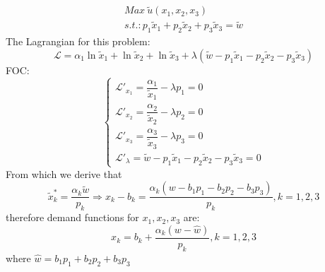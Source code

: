 \documentclass[a4paper,12pt]{article} %
\begin{document}
\begin{enumerate}
	\begin{gather*}
	Max \   \tilde{u}(x_1, x_2, x_3)  \\
	s.t.:  p_1\tilde{x}_1 +  p_2\tilde{x}_2 + p_3\tilde{x}_3 = \tilde{w} 
	\end{gather*}
		The  Lagrangian for this problem: 
	\[  \mathcal{L} =  \alpha_1 \ln \tilde{x}_{1} + \ln \tilde{x}_{2} + \ln \tilde{x}_{3} + \lambda  ( \tilde{w} - p_1\tilde{x}_1 -  p_2\tilde{x}_2 - p_3\tilde{x}_3) \]
	FOC: 
 	\begin{equation*}
\begin{cases}
\mathcal{L}'_{x_1 } =    \dfrac{\alpha_1}{\tilde{x}_{1} }  -   \lambda  p_1 = 0 \\
\mathcal{L}'_{x_2 } =    \dfrac{\alpha_2}{\tilde{x}_{2} }  -   \lambda  p_2 = 0 \\
\mathcal{L}'_{x_3 } =    \dfrac{\alpha_3}{\tilde{x}_{3} }  -   \lambda  p_3 = 0 \\
\mathcal{L}'_{\lambda} = \tilde{w} - p_1\tilde{x}_1 -  p_2\tilde{x}_2 - p_3\tilde{x}_3 = 0 
\end{cases}
\end{equation*}	 
	From which we derive that
\[ \tilde{x}^{*}_{k} = \dfrac{\alpha_k \tilde{w}  }{p_k} \Rightarrow  x_{k} - b_{k}  =  \dfrac{\alpha_k (w - b_1p_1 - b_2p_2 - b_3p_3)   }{p_k}  , k = 1, 2, 3  \]		
therefore 	demand functions for $ x_1, x_2, x_3 $ are:
	\[ x_{k} = b_{k}  +  \dfrac{\alpha_k (w - \hat{w} )   }{p_k},  k = 1, 2, 3  \]
	where $  \hat{w} = b_1p_1 + b_2p_2 + b_3p_3 $
\end{enumerate}
\end{document}

